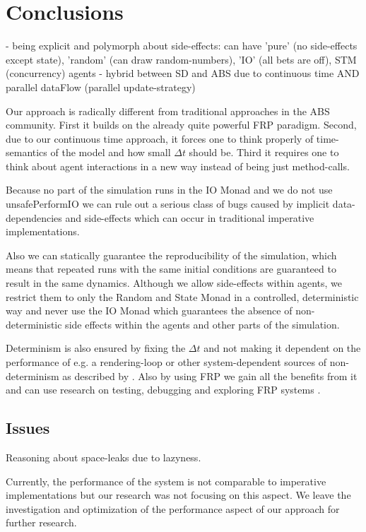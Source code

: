 \section{Conclusions}

- being explicit and polymorph about side-effects: can have 'pure' (no side-effects except state), 'random' (can draw random-numbers), 'IO' (all bets are off), STM (concurrency) agents
- hybrid between SD and ABS due to continuous time AND parallel dataFlow (parallel update-strategy)

Our approach is radically different from traditional approaches in the ABS community. First it builds on the already quite powerful FRP paradigm. Second, due to our continuous time approach, it forces one to think properly of time-semantics of the model and how small $\Delta t$ should be. Third it requires one to think about agent interactions in a new way instead of being just method-calls.

Because no part of the simulation runs in the IO Monad and we do not use unsafePerformIO we can rule out a serious class of bugs caused by implicit data-dependencies and side-effects which can occur in traditional imperative implementations.

Also we can statically guarantee the reproducibility of the simulation, which means that repeated runs with the same initial conditions are guaranteed to result in the same dynamics. Although we allow side-effects within agents, we restrict them to only the Random and State Monad in a controlled, deterministic way and never use the IO Monad which guarantees the absence of non-deterministic side effects within the agents and other parts of the simulation.

Determinism is also ensured by fixing the $\Delta t$ and not making it dependent on the performance of e.g. a rendering-loop or other system-dependent sources of non-determinism as described by \cite{perez_testing_2017}. Also by using FRP we gain all the benefits from it and can use research on testing, debugging and exploring FRP systems \cite{perez_testing_2017, perez_back_2017}.

\subsection*{Issues}
Reasoning about space-leaks due to lazyness.

Currently, the performance of the system is not comparable to imperative implementations but our research was not focusing on this aspect. We leave the investigation and optimization of the performance aspect of our approach for further research.


